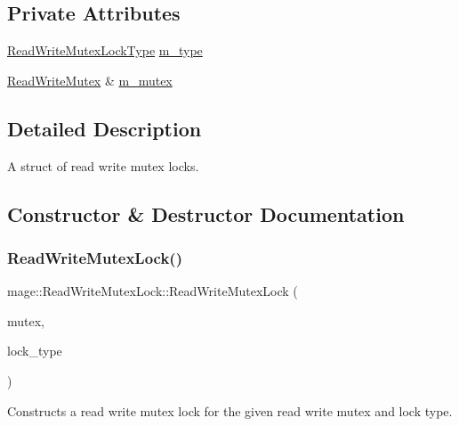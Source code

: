 \subsection*{Private Attributes}
\begin{DoxyCompactItemize}
\item 
\hyperlink{namespacemage_afd76fcca37ce5c5b2227671290973c74}{Read\+Write\+Mutex\+Lock\+Type} \hyperlink{structmage_1_1_read_write_mutex_lock_aa117ffe94f6850ddc91ad6d1389fb6e2}{m\+\_\+type}
\item 
\hyperlink{classmage_1_1_read_write_mutex}{Read\+Write\+Mutex} \& \hyperlink{structmage_1_1_read_write_mutex_lock_a6ee9034fa984e11ec07c20ec77ab1bfe}{m\+\_\+mutex}
\end{DoxyCompactItemize}


\subsection{Detailed Description}
A struct of read write mutex locks. 

\subsection{Constructor \& Destructor Documentation}
\hypertarget{structmage_1_1_read_write_mutex_lock_a323e2f45646caa23c4ee21452c8f8d4a}{}\label{structmage_1_1_read_write_mutex_lock_a323e2f45646caa23c4ee21452c8f8d4a} 
\subsubsection{\texorpdfstring{Read\+Write\+Mutex\+Lock()}{ReadWriteMutexLock()}\hspace{0.1cm}{\footnotesize\ttfamily [1/3]}}
{\footnotesize\ttfamily mage\+::\+Read\+Write\+Mutex\+Lock\+::\+Read\+Write\+Mutex\+Lock (\begin{DoxyParamCaption}\item[{\hyperlink{classmage_1_1_read_write_mutex}{Read\+Write\+Mutex} \&}]{mutex,  }\item[{\hyperlink{namespacemage_afd76fcca37ce5c5b2227671290973c74}{Read\+Write\+Mutex\+Lock\+Type}}]{lock\+\_\+type }\end{DoxyParamCaption})}

Constructs a read write mutex lock for the given read write mutex and lock type.


